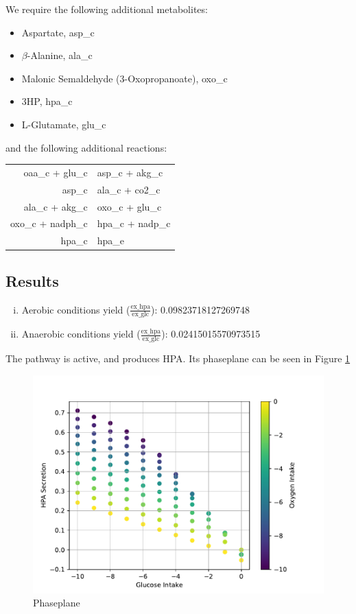 \documentclass{scrartcl}
\begin{document}
	We require the following additional metabolites:
	\begin{itemize}
		\item Aspartate, asp\_c
		\item $\beta$-Alanine, ala\_c
		\item Malonic Semaldehyde (3-Oxopropanoate), oxo\_c
		\item 3HP, hpa\_c
		\item L-Glutamate, glu\_c
	\end{itemize}
	and the following additional reactions:
	\begin{center}
	\begin{tabular}{r@{$\;\rightarrow\;$}l}
		oaa\_c + glu\_c & asp\_c + akg\_c \\
		asp\_c & ala\_c + co2\_c\\
		ala\_c + akg\_c & oxo\_c + glu\_c\\
		oxo\_c + nadph\_c & hpa\_c + nadp\_c\\
		hpa\_c & hpa\_e
	\end{tabular}
	\end{center}
	\subsection{Results}
		\begin{enumerate}[i)]
			\item Aerobic conditions yield ($\mathrm{\frac{ex\_hpa}{ex\_glc}}$): 0.09823718127269748
			\item Anaerobic conditions yield ($\mathrm{\frac{ex\_hpa}{ex\_glc}}$): 0.02415015570973515

		\end{enumerate}
		The pathway is active, and produces HPA. Its phaseplane can be seen in Figure \ref{fig:phaseplane}
		\begin{figure}[h]
			\centering
			\includegraphics[max width=0.75\linewidth]{src/phaseplane.pdf}
			\caption{Phaseplane}
			\label{fig:phaseplane}
		\end{figure}
\end{document}
